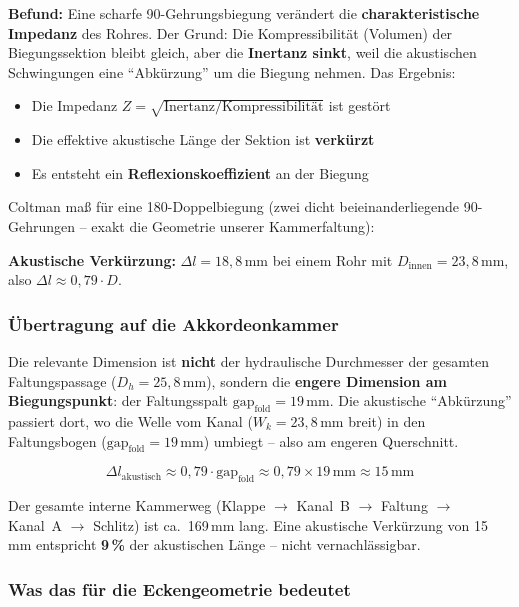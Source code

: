 \documentclass[11pt,a4paper]{article}
\begin{document}
\textbf{Befund:} Eine scharfe 90\textdegree{}-Gehrungsbiegung verändert die \textbf{charakteristische Impedanz} des Rohres. Der Grund: Die Kompressibilität (Volumen) der Biegungssektion bleibt gleich, aber die \textbf{Inertanz sinkt}, weil die akustischen Schwingungen eine ``Abkürzung'' um die Biegung nehmen. Das Ergebnis:

\begin{itemize}[leftmargin=5mm, itemsep=1pt]
\item Die Impedanz $Z = \sqrt{\text{Inertanz}/\text{Kompressibilität}}$ ist gestört
\item Die effektive akustische Länge der Sektion ist \textbf{verkürzt}
\item Es entsteht ein \textbf{Reflexionskoeffizient} an der Biegung
\end{itemize}

Coltman maß für eine 180\textdegree{}-Doppelbiegung (zwei dicht beieinanderliegende 90\textdegree{}-Gehrungen -- exakt die Geometrie unserer Kammerfaltung):

\textbf{Akustische Verkürzung:} $\Delta l = 18{,}8$\,mm bei einem Rohr mit $D_\text{innen} = 23{,}8$\,mm, also $\Delta l \approx 0{,}79 \cdot D$.

\subsubsection{Übertragung auf die Akkordeonkammer}

Die relevante Dimension ist \textbf{nicht} der hydraulische Durchmesser der gesamten Faltungspassage ($D_h = 25{,}8$\,mm), sondern die \textbf{engere Dimension am Biegungspunkt}: der Faltungsspalt $\text{gap}_\text{fold} = 19$\,mm. Die akustische ``Abkürzung'' passiert dort, wo die Welle vom Kanal ($W_k = 23{,}8$\,mm breit) in den Faltungsbogen ($\text{gap}_\text{fold} = 19$\,mm) umbiegt -- also am engeren Querschnitt.

\begin{equation*}
\Delta l_\text{akustisch} \approx 0{,}79 \cdot \text{gap}_\text{fold} \approx 0{,}79 \times 19\,\text{mm} \approx 15\,\text{mm}
\end{equation*}

Der gesamte interne Kammerweg (Klappe $\to$ Kanal~B $\to$ Faltung $\to$ Kanal~A $\to$ Schlitz) ist ca.\ 169\,mm lang. Eine akustische Verkürzung von 15\,mm entspricht \textbf{9\,\%} der akustischen Länge -- nicht vernachlässigbar.

\subsubsection{Was das für die Eckengeometrie bedeutet}
\end{document}
